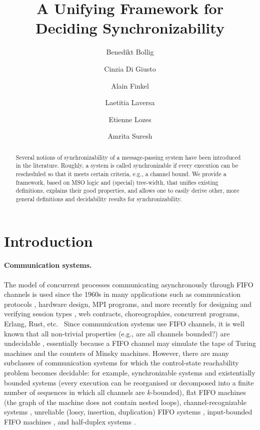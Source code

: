 \documentclass[a4paper,UKenglish,cleveref, autoref, thm-restate]{lipics-v2021}
\title{A Unifying Framework for Deciding Synchronizability}
\author{Benedikt Bollig}
       {Universit{\'e} Paris-Saclay, ENS Paris-Saclay, CNRS, LMF, France}
       {bollig@lsv.ens-cachan.fr}
       {https://orcid.org/0000-0003-0985-6115}{}
\author{Cinzia Di Giusto}
       {Universit{\'e} C\^{o}te d’Azur, CNRS, I3S, France}
       {cinzia.di-giusto@univ-cotedazur.fr}
       {https://orcid.org/0000-0003-1563-6581}{}
\author{Alain Finkel}
       {Universit{\'e} Paris-Saclay, ENS Paris-Saclay, CNRS, LMF, France \and
         Institut Universitaire de France}
       {finkel@lsv.fr}
       {https://orcid.org/0000-0003-0702-3232}{}
\author{Laetitia Laversa}
       {Universit{\'e} C\^{o}te d’Azur, CNRS, I3S, France}
       {laetitia.laversa@univ-cotedazur.fr}
       {https://orcid.org/0000-0003-3775-6496}{}
\author{Etienne Lozes}
       {Universit{\'e} C\^{o}te d’Azur, CNRS, I3S, France}
       {etienne.lozes@univ-cotedazur.fr}
       {https://orcid.org/0000-0001-8505-585X}{}
\author{Amrita Suresh}
       {Universit{\'e} Paris-Saclay, ENS Paris-Saclay, CNRS, LMF, France}
       {amrita.suresh@ens-paris-saclay.fr}
       {https://orcid.org/0000-0001-6819-9093}{}
\begin{document}
\maketitle

\begin{abstract}
Several notions of synchronizability of a message-passing
system have been introduced in the literature. Roughly, a
system is called synchronizable if every execution
can be rescheduled so that it meets certain criteria, e.g.,
a channel bound. We provide a framework, based on MSO
logic and (special) tree-width, that unifies existing definitions,
explains their good properties, and allows one to easily derive other,
more general definitions and decidability results for synchronizability.

\end{abstract}

\section{Introduction}

\paragraph*{Communication systems.}
The model of concurrent processes communicating asynchronously through FIFO channels is used since the 1960s in many applications such as communication protocols \cite{DBLP:journals/sigops/Bochmann75}, hardware design, MPI
programs, and more recently for designing and verifying session types \cite{DBLP:journals/corr/abs-1901-09606}, web contracts, choreo\-graphies, concurrent programs, Erlang, Rust, etc.
~Since communication systems use FIFO channels, it is well known that all non-trivial properties (e.g., are all channels bounded?) are undecidable \cite{DBLP:journals/jacm/BrandZ83}, essentially because a FIFO channel may simulate the tape of Turing machines and the counters of Minsky machines.
%
However, there are many subclasses of communication systems for which the control-state reachability problem becomes decidable: for example, synchronizable systems and existentially bounded systems (every execution can be reorganised or decomposed into a finite number of sequences in which all channels are $k$-bounded), flat FIFO machines \cite{EGM2012,FP-lmcs20} (the graph of the machine does not contain nested loops), channel-recognizable systems \cite{DBLP:conf/cav/BoigelotG96}, unreliable (lossy, insertion, duplication) FIFO systems \cite{GC-AF-SPI-IC-96}, input-bounded FIFO machines \cite{BDM-concur20}, and half-duplex systems \cite{CF-icomp05}.
\end{document}
